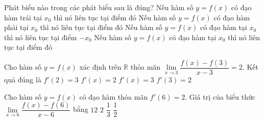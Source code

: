 \begin{ex}%
	Phát biểu nào trong các phát biểu sau  là đúng?
	\choice 
		{Nếu hàm số $y=f(x)$ có đạo hàm trái tại $x_{0}$ thì nó liên tục  tại điểm đó}
		{Nếu hàm số $y=f(x)$ có đạo hàm phải tại $x_{0}$ thì nó liên tục  tại điểm đó}
		{Nếu hàm  số $y=f(x)$ có đạo hàm tại $x_{0}$ thì nó liên tục tại điểm $-x_{0}$}
		{\True Nếu  hàm số $y=f(x)$ có đạo hàm tại $x_{0}$ thì nó liên tục tại điểm đó}
\end{ex}

\begin{ex}%
	Cho hàm  số $y=f(x)$ xác định trên $\mathbb{R}$ thỏa mãn $\displaystyle\underset{x\to 3}{\mathop{\lim}}\dfrac{f(x)-f\left(3\right)}{x-3}=2$. Kết quả đúng là
	 \choice
		{$f'\left(2\right)=3$} 
		{$f'\left(x\right)=2$} 
		{$f'\left(x\right)=3$} 
		{\True  $f'\left(3\right)=2$}
\end{ex}

\begin{ex}%
	Cho hàm số $ y=f(x)$  có đạo hàm thỏa mãn $f'(6)=2$. Giá trị của biểu thức $\lim\limits_{x\to 6}\dfrac{f(x)-f(6)}{x-6}$ bằng
	\choice 
		 {$12$}
		{\True $2$} 
		 {$\dfrac{1}{3}$}
		{$\dfrac{1}{2}$} 
\end{ex}

